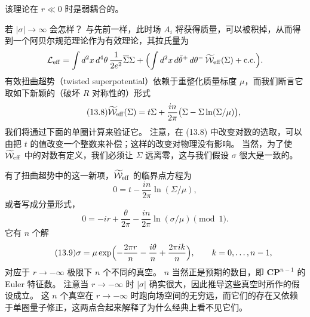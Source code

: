 
该理论在 $r\ll0$ 时是弱耦合的。

若 $|\sigma|\to\infty$ 会怎样？
与先前一样，此时场 $A_i$ 将获得质量，可以被积掉，从而得到一个阿贝尔规范理论作为有效理论，其拉氏量为
\[
\mathcal{L}_{\rm eff}=\int d^2x\,d^4\theta\,\frac{1}{2e^2}\overline{\Sigma}\Sigma
+\Bigl(\int d^2x\,d\bar\theta^+\,d\theta^-\,\widetilde{\mathcal{W}}_{\rm eff}(\Sigma)+{\rm c.c.}\Bigr).
\]
有效扭曲超势（twisted superpotential）依赖于重整化质量标度 $\mu$，而我们断言它取如下新颖的（破坏 $R$ 对称性的）形式
\begin{equation}
  \tag{13.8}
  \label{eq:13-8}
  \widetilde{\mathcal{W}}_{\rm eff}(\Sigma)=t\Sigma+\frac{in}{2\pi}\bigl(\Sigma-\Sigma\ln(\Sigma/\mu)\bigr),
\end{equation}
我们将通过下面的单圈计算来验证它。
注意，在 (13.8) 中改变对数的选取，可以由把 $t$ 的值改变一个整数来补偿；这样的改变对物理没有影响。
当然，为了使 $\widetilde{\mathcal{W}}_{\rm eff}$ 中的对数有定义，我们必须让 $\Sigma$ 远离零，这与我们假设 $\sigma$ 很大是一致的。


有了扭曲超势中的这一新项，$\widetilde{\mathcal{W}}_{\rm eff}$ 的临界点方程为
\[
0=t-\frac{in}{2\pi}\ln(\Sigma/\mu),
\]
或者写成分量形式，
\[
0=-ir+\frac{\theta}{2\pi}-\frac{in}{2\pi}\ln(\sigma/\mu)\pmod 1.
\]
它有 $n$ 个解
\begin{equation}
  \tag{13.9}
  \label{eq:13-9}
  \sigma=\mu\exp\Bigl(-\frac{2\pi r}{n}-\frac{i\theta}{n}+\frac{2\pi ik}{n}\Bigr),\qquad
  k=0,\dots,n-1,
\end{equation}
对应于 $r\to-\infty$ 极限下 $n$ 个不同的真空。
$n$ 当然正是预期的数目，即 $\mathbf{CP}^{n-1}$ 的 Euler 特征数。
注意当 $r\to-\infty$ 时 $|\sigma|$ 确实很大，因此推导这些真空时所作的假设成立。
这 $n$ 个真空在 $r\to-\infty$ 时跑向场空间的无穷远，而它们的存在又依赖于单圈量子修正，这两点合起来解释了为什么经典上看不见它们。

